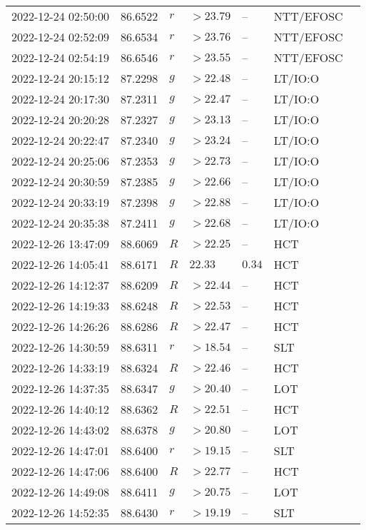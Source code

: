 \documentclass{nature_plusfigure}
\begin{document}
\begin{supplement}
\begin{center}
\begin{longtable}{lllllll}
2022-12-24 02:50:00 & 86.6522 & $r$ & $>23.79$ & -- & NTT/EFOSC &  \\ 
2022-12-24 02:52:09 & 86.6534 & $r$ & $>23.76$ & -- & NTT/EFOSC &  \\ 
2022-12-24 02:54:19 & 86.6546 & $r$ & $>23.55$ & -- & NTT/EFOSC &  \\ 
2022-12-24 20:15:12 & 87.2298 & $g$ & $>22.48$ & -- & LT/IO:O &  \\ 
2022-12-24 20:17:30 & 87.2311 & $g$ & $>22.47$ & -- & LT/IO:O &  \\ 
2022-12-24 20:20:28 & 87.2327 & $g$ & $>23.13$ & -- & LT/IO:O &  \\ 
2022-12-24 20:22:47 & 87.2340 & $g$ & $>23.24$ & -- & LT/IO:O &  \\ 
2022-12-24 20:25:06 & 87.2353 & $g$ & $>22.73$ & -- & LT/IO:O &  \\ 
2022-12-24 20:30:59 & 87.2385 & $g$ & $>22.66$ & -- & LT/IO:O &  \\ 
2022-12-24 20:33:19 & 87.2398 & $g$ & $>22.88$ & -- & LT/IO:O &  \\ 
2022-12-24 20:35:38 & 87.2411 & $g$ & $>22.68$ & -- & LT/IO:O &  \\ 
2022-12-26 13:47:09 & 88.6069 & $R$ & $>22.25$ & -- & HCT &  \\ 
2022-12-26 14:05:41 & 88.6171 & $R$ & $22.33$ & $0.34$ & HCT &  \\ 
2022-12-26 14:12:37 & 88.6209 & $R$ & $>22.44$ & -- & HCT &  \\ 
2022-12-26 14:19:33 & 88.6248 & $R$ & $>22.53$ & -- & HCT &  \\ 
2022-12-26 14:26:26 & 88.6286 & $R$ & $>22.47$ & -- & HCT &  \\ 
2022-12-26 14:30:59 & 88.6311 & $r$ & $>18.54$ & -- & SLT &  \\ 
2022-12-26 14:33:19 & 88.6324 & $R$ & $>22.46$ & -- & HCT &  \\ 
2022-12-26 14:37:35 & 88.6347 & $g$ & $>20.40$ & -- & LOT &  \\ 
2022-12-26 14:40:12 & 88.6362 & $R$ & $>22.51$ & -- & HCT &  \\ 
2022-12-26 14:43:02 & 88.6378 & $g$ & $>20.80$ & -- & LOT &  \\ 
2022-12-26 14:47:01 & 88.6400 & $r$ & $>19.15$ & -- & SLT &  \\ 
2022-12-26 14:47:06 & 88.6400 & $R$ & $>22.77$ & -- & HCT &  \\ 
2022-12-26 14:49:08 & 88.6411 & $g$ & $>20.75$ & -- & LOT &  \\ 
2022-12-26 14:52:35 & 88.6430 & $r$ & $>19.19$ & -- & SLT &  \\ 

\end{longtable}
\end{center}
\end{supplement}
\end{document}
